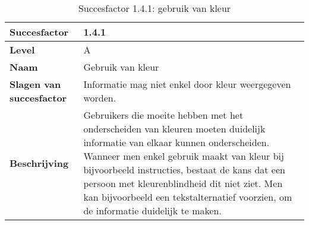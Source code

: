 \begin{table}[H]
    \centering
    \caption{Succesfactor 1.4.1: gebruik van kleur}
    \hspace*{-1cm}\begin{tabular}{|l|p{12cm}|} 
        \hline
        \textbf{Succesfactor}                 & 1.4.1                                                                                                                                                                                                                                                                                                                                                                                                                                                                                                            \\ 
        \hline
        \textbf{Level}                        & A                                                                                                                                                                                                                                                                                                                                                                                                                                                                                                                 \\ 
        \hline
        \textbf{Naam}                         & Gebruik van kleur~                                                                                                                                                                                                                                                                                                                                                                                                                                                                                      \\ 
        \hline
        \textbf{Slagen van succesfactor}      & Informatie mag niet enkel door kleur weergegeven worden.                                                                                                                                                                                                                                                                     \\ 
        \hline
        \textbf{Beschrijving}                 & Gebruikers die moeite hebben met het onderscheiden van kleuren moeten duidelijk informatie van elkaar kunnen onderscheiden. Wanneer men enkel gebruik maakt van kleur bij bijvoorbeeld instructies, bestaat de kans dat een persoon met kleurenblindheid dit niet ziet. Men kan bijvoorbeeld een tekstalternatief voorzien, om de informatie duidelijk te maken. \\ 

\end{tabular}
\end{table}
